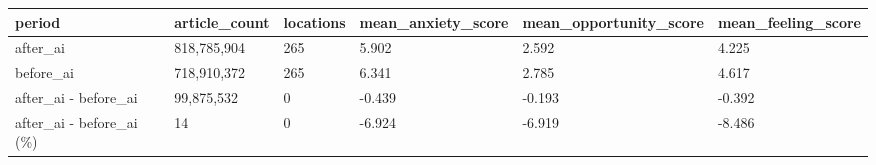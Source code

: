 \begin{tabular}{llllll}
\toprule
period & article\_count & locations & mean\_anxiety\_score & mean\_opportunity\_score & mean\_feeling\_score \\
\midrule
after\_ai & 818,785,904 & 265 & 5.902 & 2.592 & 4.225 \\
before\_ai & 718,910,372 & 265 & 6.341 & 2.785 & 4.617 \\
after\_ai - before\_ai & 99,875,532 & 0 & -0.439 & -0.193 & -0.392 \\
after\_ai - before\_ai (\%) & 14 & 0 & -6.924 & -6.919 & -8.486 \\
\bottomrule
\end{tabular}
